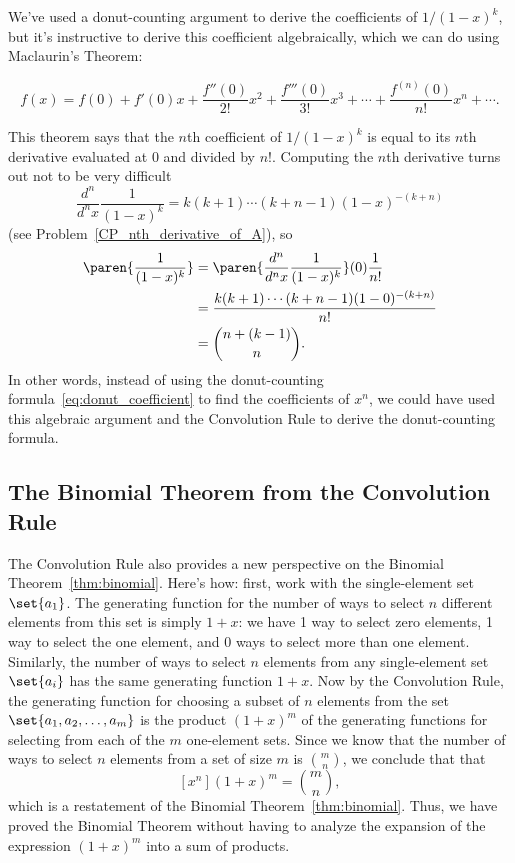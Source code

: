 We've used a donut-counting argument to derive the coefficients of
$1/(1-x)^k$, but it's instructive to derive this coefficient
algebraically, which we can do using Maclaurin's Theorem:
\begin{theorem}\label{thm:maclauren}
\[
f(x) = f(0) + f'(0) x + \frac{f''(0)}{2!} x^2 + \frac{f'''(0)}{3!} x^3 + \cdots
+ \frac{f^{(n)}(0)}{n!} x^n + \cdots.
\]
\end{theorem}

This theorem says that the $n$th coefficient of $1 / (1 - x)^k$ is
equal to its $n$th derivative evaluated at 0 and divided by $n!$.
Computing the $n$th derivative turns out not to be very difficult
\[
\frac{d^n}{d^n x} \frac{1}{(1-x)^k} = k (k+1) \cdots (k + n - 1)(1-x)^{-(k+n)}
\]
(see Problem~\ref{CP_nth_derivative_of_A}), so
\begin{align*}
[x^n]\paren{\frac{1}{(1-x)^k}}
  & = \paren{\frac{d^n}{d^n x} \frac{1}{(1-x)^k}}(0)\frac{1}{n!}\\
  & = \frac{k (k+1) \cdots (k + n - 1)(1-0)^{-(k+n)}}{n!}\\
  & = \binom{n+ (k-1)}{n}.
\end{align*}
In other words, instead of using the donut-counting
formula~\eqref{eq:donut_coefficient} to find the coefficients of
$x^n$, we could have used this algebraic argument and the Convolution
Rule to derive the donut-counting formula.

\subsection{The Binomial Theorem from the Convolution Rule}

The Convolution Rule also provides a new perspective on the Binomial
Theorem~\ref{thm:binomial}.  Here's how: first, work with the
single-element set $\set{a_1}$.  The generating function for the
number of ways to select $n$ different elements from this set is
simply $1 + x$: we have 1 way to select zero elements, 1 way to select
the one element, and 0 ways to select more than one element.
Similarly, the number of ways to select $n$ elements from any
single-element set $\set{a_i}$ has the same generating function $1 +
x$.  Now by the Convolution Rule, the generating function for choosing
a subset of $n$ elements from the set $\set{a_1,a_2,\dots,a_m}$ is the
product $(1+x)^m$ of the generating functions for selecting from each
of the $m$ one-element sets.  Since we know that the number of ways to
select $n$ elements from a set of size $m$ is $\binom{m}{n}$, we
conclude that that
\[
[x^n](1+x)^m = \binom{m}{n},
\]
which is a restatement of the Binomial Theorem~\ref{thm:binomial}.
Thus, we have proved the Binomial Theorem without having to analyze
the expansion of the expression $(1+x)^m$ into a sum of products.

